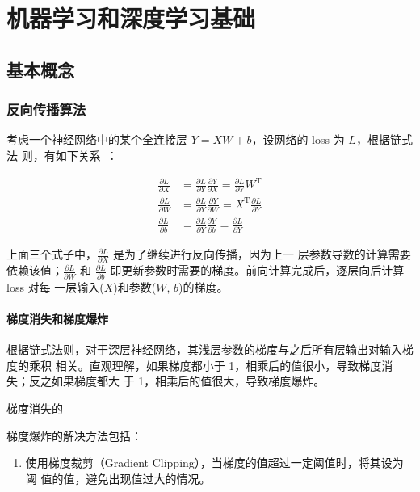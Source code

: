 \part{机器学习和深度学习基础}

\chapter{基本概念}

\section{反向传播算法}
考虑一个神经网络中的某个全连接层 $Y = XW + b$，设网络的 loss 为 $L$，根据链式法
则，有如下关系~：

\begin{align}
  \label{equ:bp-fc}
  \frac{\partial L}{\partial X} & = \frac{\partial L}{\partial Y} \frac{\partial Y}{\partial X} = \frac{\partial L}{\partial Y} W^{\mathrm{T}} \\
  \frac{\partial L}{\partial W} & = \frac{\partial L}{\partial Y} \frac{\partial Y}{\partial W} = X^{\mathrm{T}} \frac{\partial L}{\partial Y}\\
  \frac{\partial L}{\partial b} & = \frac{\partial L}{\partial Y} \frac{\partial Y}{\partial b} = \frac{\partial L}{\partial Y}
\end{align}

上面三个式子中，$\frac{\partial L}{\partial X}$ 是为了继续进行反向传播，因为上一
层参数导数的计算需要依赖该值；$\frac{\partial L}{\partial W}$ 和 $\frac{\partial
  L}{\partial b}$ 即更新参数时需要的梯度。前向计算完成后，逐层向后计算 loss 对每
一层输入($X$)和参数($W, \, b$)的梯度。

\subsection{梯度消失和梯度爆炸}
根据链式法则，对于深层神经网络，其浅层参数的梯度与之后所有层输出对输入梯度的乘积
相关。直观理解，如果梯度都小于 1，相乘后的值很小，导致梯度消失；反之如果梯度都大
于 1，相乘后的值很大，导致梯度爆炸。

梯度消失的

梯度爆炸的解决方法包括：

\begin{enumerate}
  \item 使用梯度裁剪（Gradient Clipping），当梯度的值超过一定阈值时，将其设为阈
    值的值，避免出现值过大的情况。
\end{enumerate}

